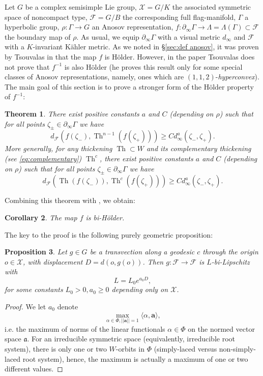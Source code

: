 \documentclass[12pt]{amsbook}%
\newtheorem{thm}{Theorem}[chapter]
\newtheorem{prop}[thm]{Proposition}
\newtheorem{cor}[thm]{Corollary}
\theoremstyle{definition}
\theoremstyle{remark}
\numberwithin{section}{chapter}
\numberwithin{subsection}{section}
\numberwithin{figure}{chapter}
\DeclareMathOperator{\Th}{Th}
\def\cF{{\mathscr{F}}}
\def\cX{{\mathscr{X}}}
\def\ba{\mathbf{a}}
\def\Ga{\Gamma}
\def\La{\Lambda}
\def\geo{\partial_\infty}
\begin{document}
{{Let $G$ be a complex semisimple Lie group, $\cX=G/K$ the associated symmetric space of noncompact type, $\cF=G/B$ the corresponding full flag-manifold, $\Ga$ a hyperbolic group, $\rho:  \Ga\to G$ an Anosov representation, $f: \geo \Ga\to \La=\La(\Ga) \subset \cF$ the boundary map of $\rho$. As usual, we equip $\geo \Ga$ with a visual metric $d_\infty$ and $\cF$ with a $K$-invariant K\"ahler metric. As we noted in \S \ref{sec:def anosov}, it was proven by Tsouvalas in \cite{Tsouvalas} that the map $f$ is H\"older. However, in the paper Tsouvalas does not prove that $f^{-1}$ is also H\"older (he proves this result only for some special classes of Anosov representations, namely, ones which are $(1,1,2)$-{\em hyperconvex}). The main goal of this section is to prove a stronger form of the H\"older property of  $f^{-1}$:  

\begin{thm}\label{thm:biholder}
There exist positive constants $a$ and  $C$ (depending on $\rho$) such that for all points $\zeta_\pm\in \geo \Ga$  we have
$$
d_{\cF}(f(\zeta_-), \Th^{n-1}(f(\zeta_+)))\geqslant C d^a_\infty(\zeta_-, \zeta_+). 
$$
More generally, for any thickening $\Th\subset W$ and its complementary thickening (see \eqref{eq:complementary}) $\Th^c$, 
there exist positive constants $a$ and  $C$ (depending on $\rho$) such that for all points $\zeta_\pm\in \geo \Ga$  we have
$$
d_{\cF}(\Th(f(\zeta_-)), \Th^{c}(f(\zeta_+)))\geqslant C d^a_\infty(\zeta_-, \zeta_+).
$$
\end{thm}


Combining this theorem with \cite[Theorem 1.6]{Tsouvalas}, we obtain: 

\begin{cor}\label{cor:biholder}
The map $f$ is bi-H\"older. 
\end{cor}

The key to the proof is the following purely geometric proposition:

\begin{prop}\label{prop:holder}
Let $g\in G$ be a transvection along a geodesic $c$ through the origin $o\in \cX$, with displacement $D=d(o, g(o))$. Then $g: \cF\to \cF$ is 
$L$-bi-Lipschitz with 
$$
L= L_0 e^{a_0 D}, 
$$ 
for some constants $L_0>0, a_0\geqslant 0$ depending only on $\cX$. 
\end{prop}
\begin{proof} We let $a_0$ denote 
$$
\max_{\alpha\in \Phi, ||\ba||=1} \langle \alpha, \ba\rangle, 
$$
i.e. the maximum of norms of the linear functionals $\alpha\in \Phi$ on the normed vector space $\mathfrak{a}$. For an irreducible symmetric space (equivalently, irreducible root system), there is only one or two $W$-orbits in $\Phi$ (simply-laced versus non-simply-laced root system), hence, the maximum is actually a maximum of one or two different values.  



\end{proof}}}
\end{document}
